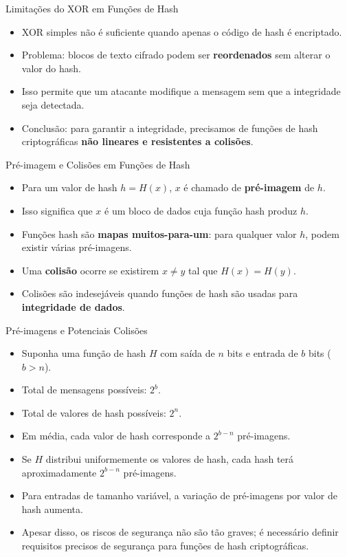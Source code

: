 \begin{frame}{Limitações do XOR em Funções de Hash}
    \begin{itemize}
        \item XOR simples não é suficiente quando apenas o código de hash é encriptado.
        \item Problema:  blocos de texto cifrado podem ser \textbf{reordenados} sem alterar o valor do hash.
        \item Isso permite que um atacante modifique a mensagem sem que a integridade seja detectada.
        \item Conclusão: para garantir a integridade, precisamos de funções de hash criptográficas \textbf{não lineares e resistentes a colisões}.
    \end{itemize}
\end{frame}

\begin{frame}{Pré-imagem e Colisões em Funções de Hash}
    \begin{itemize}
        \item Para um valor de hash $h = H(x)$, $x$ é chamado de \textbf{pré-imagem} de $h$.
        \item Isso significa que $x$ é um bloco de dados cuja função hash produz $h$.
        \item Funções hash são \textbf{mapas muitos-para-um}: para qualquer valor $h$, podem existir várias pré-imagens.
        \item Uma \textbf{colisão} ocorre se existirem $x \neq y$ tal que $H(x) = H(y)$.
        \item Colisões são indesejáveis quando funções de hash são usadas para \textbf{integridade de dados}.
    \end{itemize}
\end{frame}

\begin{frame}{Pré-imagens e Potenciais Colisões}
    \begin{itemize}
        \item Suponha uma função de hash $H$ com saída de $n$ bits e entrada de $b$ bits ($b > n$).
        \item Total de mensagens possíveis: $2^b$.
        \item Total de valores de hash possíveis: $2^n$.
        \item Em média, cada valor de hash corresponde a $2^{b-n}$ pré-imagens.
        \item Se $H$ distribui uniformemente os valores de hash, cada hash terá aproximadamente $2^{b-n}$ pré-imagens.
        \item Para entradas de tamanho variável, a variação de pré-imagens por valor de hash aumenta.
        \item Apesar disso, os riscos de segurança não são tão graves; é necessário definir requisitos precisos de segurança para funções de hash criptográficas.
    \end{itemize}
\end{frame}

